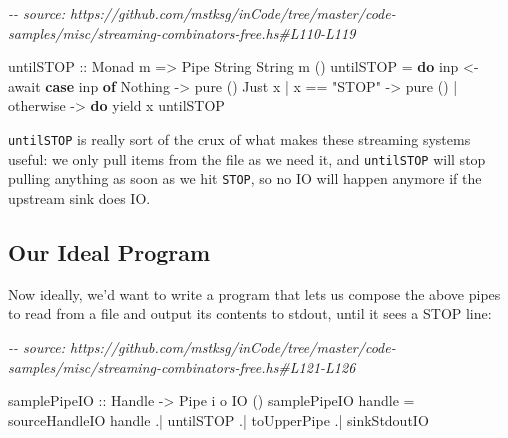 \documentclass[]{article}
\newenvironment{Shaded}{}{}
\newcommand{\CommentTok}[1]{\textcolor[rgb]{0.38,0.63,0.69}{\textit{#1}}}
\newcommand{\DataTypeTok}[1]{\textcolor[rgb]{0.56,0.13,0.00}{#1}}
\newcommand{\FunctionTok}[1]{\textcolor[rgb]{0.02,0.16,0.49}{#1}}
\newcommand{\KeywordTok}[1]{\textcolor[rgb]{0.00,0.44,0.13}{\textbf{#1}}}
\newcommand{\NormalTok}[1]{#1}
\newcommand{\OperatorTok}[1]{\textcolor[rgb]{0.40,0.40,0.40}{#1}}
\newcommand{\OtherTok}[1]{\textcolor[rgb]{0.00,0.44,0.13}{#1}}
\newcommand{\StringTok}[1]{\textcolor[rgb]{0.25,0.44,0.63}{#1}}
\begin{document}
\begin{Shaded}
\begin{Highlighting}[]
\CommentTok{{-}{-} source: https://github.com/mstksg/inCode/tree/master/code{-}samples/misc/streaming{-}combinators{-}free.hs\#L110{-}L119}

\OtherTok{untilSTOP ::} \DataTypeTok{Monad}\NormalTok{ m }\OtherTok{=\textgreater{}} \DataTypeTok{Pipe} \DataTypeTok{String} \DataTypeTok{String}\NormalTok{ m ()}
\NormalTok{untilSTOP }\OtherTok{=} \KeywordTok{do}
\NormalTok{    inp }\OtherTok{\textless{}{-}}\NormalTok{ await}
    \KeywordTok{case}\NormalTok{ inp }\KeywordTok{of}
      \DataTypeTok{Nothing} \OtherTok{{-}\textgreater{}} \FunctionTok{pure}\NormalTok{ ()}
      \DataTypeTok{Just}\NormalTok{ x}
        \OperatorTok{|}\NormalTok{ x }\OperatorTok{==} \StringTok{"STOP"} \OtherTok{{-}\textgreater{}} \FunctionTok{pure}\NormalTok{ ()}
        \OperatorTok{|} \FunctionTok{otherwise}   \OtherTok{{-}\textgreater{}} \KeywordTok{do}
\NormalTok{            yield x}
\NormalTok{            untilSTOP}
\end{Highlighting}
\end{Shaded}

\texttt{untilSTOP} is really sort of the crux of what makes these streaming
systems useful: we only pull items from the file as we need it, and
\texttt{untilSTOP} will stop pulling anything as soon as we hit \texttt{STOP},
so no IO will happen anymore if the upstream sink does IO.

\subsection{Our Ideal Program}\label{our-ideal-program}

Now ideally, we'd want to write a program that lets us compose the above pipes
to read from a file and output its contents to stdout, until it sees a STOP
line:

\begin{Shaded}
\begin{Highlighting}[]
\CommentTok{{-}{-} source: https://github.com/mstksg/inCode/tree/master/code{-}samples/misc/streaming{-}combinators{-}free.hs\#L121{-}L126}

\OtherTok{samplePipeIO ::} \DataTypeTok{Handle} \OtherTok{{-}\textgreater{}} \DataTypeTok{Pipe}\NormalTok{ i o }\DataTypeTok{IO}\NormalTok{ ()}
\NormalTok{samplePipeIO handle }\OtherTok{=}
\NormalTok{       sourceHandleIO handle}
    \OperatorTok{.|}\NormalTok{ untilSTOP}
    \OperatorTok{.|}\NormalTok{ toUpperPipe}
    \OperatorTok{.|}\NormalTok{ sinkStdoutIO}
\end{Highlighting}
\end{Shaded}
\end{document}
